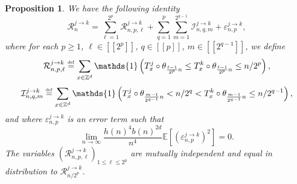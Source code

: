 \documentclass[10pt,a4paper]{amsart}
\newcommand{\EE}{\mathbb E}
\newcommand{\1}{\mathds{1}}
\newcommand{\ZZ}{\mathbb Z}
\newcommand{\eqdef}{\stackrel{\scaleto{\mathrm{def}}{3.5pt}}{=}}
\newtheorem{proposition}{Proposition}
\numberwithin{equation}{section}
\begin{document}
\begin{proposition}
\label{proposition:decomposition of R_n^(j->k)}
    We have the following identity 
    \begin{equation}
    \label{eq:decomposition of R_n^(j->k)}
        \mathcal R_n^{j\rightarrow k}=\sum_{\ell=1}^{2^p}\mathcal R_{n,p,\ell}^{j\rightarrow k}+\sum_{q=1}^{p}\sum_{m=1}^{2^{q-1}}\mathcal I_{n,q,m}^{j\rightarrow k}+\varepsilon_{n,p}^{j\rightarrow k},
    \end{equation}
    where for each $p\ge1$, $\ell\in[\![2^p]\!]$, $q\in[\![p]\!]$, $m\in[\![2^{q-1}]\!]$, we define 
    \begin{equation}
    \label{eq:defintion of R_(n,p,ell)^(j->k)}
        \mathcal R_{n,p,\ell}^{j\rightarrow k}\eqdef\sum_{x\in\ZZ^d}\1\left(T_x^j\circ\theta_{\frac{\ell-1}{2^p}n}\le T_x^k\circ\theta_{\frac{\ell-1}{2^p}n}\le n/2^p\right),
    \end{equation}
    \begin{equation}
    \label{eq:defintion of I_(n,q,m)^(j->k)}
        \mathcal I_{n,q,m}^{j\rightarrow k}\eqdef\sum_{x\in\ZZ^d}\1\left(T_x^j\circ\theta_{\frac{m-1}{2^{q-1}}n}<n/2^q<T_x^k\circ\theta_{\frac{m-1}{2^{q-1}}n}\le n/2^{q-1}\right),
    \end{equation}
    and where $\varepsilon_{n,p}^{j\rightarrow k}$ is an error term such that 
    \begin{equation*}
        \underset{n\rightarrow\infty}\lim\frac{h(n)^4b(n)^{2d}}{n^4}\EE\left[(\varepsilon_{n,p}^{j\rightarrow k})^2\right]=0.
    \end{equation*}
    The variables $(\mathcal R_{n,p,\ell}^{j\rightarrow k})_{1\le \ell\le 2^p}$ are mutually independent and equal in distribution to $\mathcal R_{n/2^p}^{j\rightarrow k}$.
\end{proposition}
\end{document}
